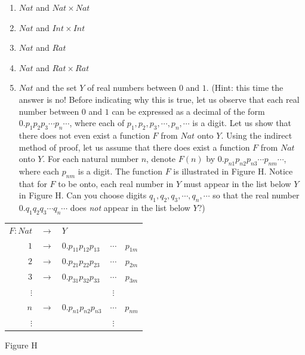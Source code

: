 \documentclass{book}
\begin{document}
\begin{description}
\begin{enumerate}
  \item[\hspace{1cm}(e)] $Nat$ and $Nat \times Nat$
  \item[\hspace{1cm}(f)] $Nat$ and $Int \times Int$
  \item[\hspace{1cm}(g)] $Nat$ and $Rat$
  \item[\hspace{1cm}(h)] $Nat$ and $Rat \times Rat$
  \item[\hspace{1cm}(i)] $Nat$ and the set $Y$ of real numbers between $0$ and $1$. (Hint: this time the answer is no! Before indicating why this is true, let us observe that each real number between $0$ and $1$ can be expressed as a decimal of the form $0.p_{1} p_{2} p_{3} \cdots p_{n} \cdots$, where each of $p_{1}, p_{2}, p_{3}, \cdots, p_{n}, \cdots$ is a digit. Let us show that there does not even exist a function $F$ from $Nat$ onto $Y$. Using the indirect method of proof, let us assume that there does exist a function $F$ from $Nat$ onto $Y$. For each natural number $n$, denote $F(n)$ by $0.p_{n1} p_{n2} p_{n3} \cdots p_{nm} \cdots$, where each $p_{nm}$ is a digit. The function $F$ is illustrated in Figure H. Notice that for $F$ to be onto, each real number in $Y$ must appear in the list below $Y$ in Figure H. Can you choose digits $q_{1}, q_{2}, q_{3}, \cdots, q_{n}, \cdots$ so that the real number $0.q_{1} q_{2} q_{3} \cdots q_{n} \cdots$ does \emph{not} appear in the list below $Y$?)
\end{enumerate}

\begin{center}
\begin{tabular}{rclcc}
   $F:Nat$ & $\rightarrow$ & $Y$                      &          &          \\
       $1$ & $\rightarrow$ & $0.p_{11} p_{12} p_{13}$ & $\cdots$ & $p_{1m}$ \\
       $2$ & $\rightarrow$ & $0.p_{21} p_{22} p_{23}$ & $\cdots$ & $p_{2m}$ \\
       $3$ & $\rightarrow$ & $0.p_{31} p_{32} p_{33}$ & $\cdots$ & $p_{3m}$ \\
  $\vdots$ &               &                          & $\vdots$ &          \\
       $n$ & $\rightarrow$ & $0.p_{n1} p_{n2} p_{n3}$ & $\cdots$ & $p_{nm}$ \\
  $\vdots$ &               &                          & $\vdots$ &          \\
\end{tabular}
\end{center}
\begin{center}
Figure H
\end{center}


\end{description}
\end{document}
